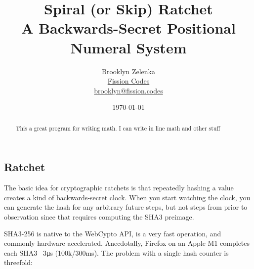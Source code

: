 \documentclass{article}
\title{Spiral (or Skip) Ratchet \\[1ex] \large A Backwards-Secret Positional Numeral System}
\author{Brooklyn Zelenka \\ \href{https://fission.codes}{Fission Codes} \\ \href{mailto:brooklyn@fission.codes}{brooklyn@fission.codes} }
\date{\today}
\begin{document}
    \maketitle %
    \begin{multicols}{2}
    	\begin{abstract}
    		This a great program for writing math. I can write in line math and other stuff
    	\end{abstract}
	    \section{Ratchet}
	    
	    
	    
	    The basic idea for cryptographic ratchets is that repeatedly hashing a value creates a kind of backwards-secret clock. When you start watching the clock, you can generate the hash for any arbitrary future steps, but not steps from prior to observation since that requires computing the SHA3 preimage.
	    
	    SHA3-256 is native to the WebCypto API, is a very fast operation, and commonly hardware accelerated. Anecdotally, Firefox on an Apple M1 completes each SHA3 ~3\si{\micro\second} (100k/300\si{\milli\second}). The problem with a single hash counter is threefold:
	\end{multicols}
\end{document}
